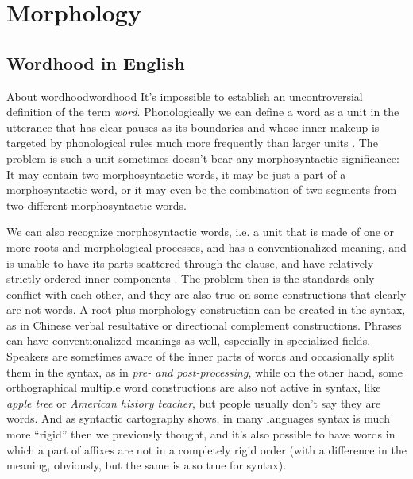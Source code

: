\documentclass[UTF8, a4paper, oneside, scheme=plain]{ctexrep}
\newcommand*{\citesec}[1]{\S~{#1}}
\newcommand*{\term}[1]{\emph{#1}}
\newcommand{\corpus}[1]{\emph{#1}}
\begin{document}
\section{Morphology}

\subsection{Wordhood in English}

\begin{theorybox}{About wordhood}{wordhood}
    It's impossible to establish an uncontroversial definition of the term \term{word}.
    Phonologically we can define a word as a unit in the utterance
    that has clear pauses as its boundaries and 
    whose inner makeup is targeted by phonological rules much more frequently
    than larger units \citep[\citesec{10.3}]{dixon2010basic2}.
    The problem is such a unit sometimes doesn't bear any morphosyntactic significance:
    It may contain two morphosyntactic words,
    it may be just a part of a morphosyntactic word,
    or it may even be the combination of two segments from two different morphosyntactic words.

    We can also recognize morphosyntactic words, 
    i.e. a unit that is made of one or more roots and morphological processes, and
    has a conventionalized meaning, and
    is unable to have its parts scattered through the clause,
    and have relatively strictly ordered inner components
    \citep[\citesec{10.4}]{dixon2010basic2}.
    The problem then is the standards only conflict with each other,
    and they are also true on some constructions that clearly are not words.
    A root-plus-morphology construction 
    can be created in the syntax,
    as in Chinese verbal resultative or directional complement constructions.
    Phrases can have conventionalized meanings as well,
    especially in specialized fields.
    Speakers are sometimes aware of the inner parts of words 
    and occasionally split them in the syntax,
    as in \corpus{pre- and post-processing},
    while on the other hand,
    some orthographical multiple word constructions 
    are also not active in syntax,
    like \corpus{apple tree} or \corpus{American history teacher},
    but people usually don't say they are words.
    And as syntactic cartography shows,
    in many languages syntax is much more ``rigid'' then we previously thought,
    and it's also possible to have words in which a part of affixes are not in a completely rigid order
    (with a difference in the meaning, obviously, but the same is also true for syntax).


\end{theorybox}
\end{document}

